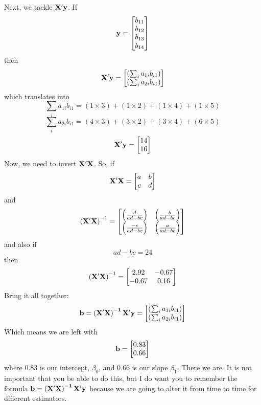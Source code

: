 Next, we tackle ${\bf X'y}$. If
\[
{\bf y} =
\begin{bmatrix}
b_{11} \\
b_{12} \\
b_{13} \\
b_{14} \\
\end{bmatrix}
\]
then
\begin{equation}
{\bf X'y} =
\begin{bmatrix}
\left(\sum_ia_{1i}b_{i1}\right) \\
\left(\sum_ia_{2i}b_{i1}\right) \\
\end{bmatrix}
\end{equation}
which translates into
\[
\sum_ia_{1i}b_{i1} = \left(1\times3\right)+\left(1\times2\right)+\left(1\times4\right)+\left(1\times5\right)
\]
\[
\sum_ia_{2i}b_{i1} = \left(4\times3\right)+\left(3\times2\right)+\left(3\times4\right)+\left(6\times5\right)
\]
\[
{\bf X'y} =
\begin{bmatrix}
14 \\
16 \\
\end{bmatrix}
\]
Now, we need to invert $\bf X'X$. So, if
\[
{\bf X'X} =
\begin{bmatrix}
a&b \\
c&d \\
\end{bmatrix}
\]
and
\begin{equation}
\left({\bf X'X}\right)^{-1} =
\begin{bmatrix}
\left(\frac{d}{ad-bc}\right)&\left(\frac{-b}{ad-bc}\right) \\
\left(\frac{-c}{ad-bc}\right)&\left(\frac{a}{ad-bc}\right) \\
\end{bmatrix}
\end{equation}
and also if
\[
ad-bc = 24
\]
then
\[
\left({\bf X'X}\right)^{-1} =
\begin{bmatrix}
2.92&-0.67 \\
-0.67&0.16 \\
\end{bmatrix}
\]
Bring it all together:
\[
{\bf b = \left(X'X\right)^{-1}X'y} =
\begin{bmatrix}
\left(\sum_ia_{1i}b_{i1}\right) \\
\left(\sum_ia_{2i}b_{i1}\right) \\
\end{bmatrix}
\]
Which means we are left with
\[
\bf b =
\begin{bmatrix}
0.83 \\
0.66 \\
\end{bmatrix}
\]
where 0.83 is our intercept, $\beta_0$, and 0.66 is our slope $\beta_1$. There we are. It is not important that you be able to do this, but I do want you to remember the formula $\bf b = \left(X'X\right)^{-1}X'y$ because we are going to alter it from time to time for different estimators.

